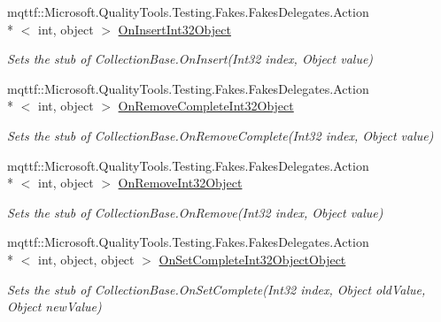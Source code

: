\begin{DoxyCompactItemize}
mqttf\-::\-Microsoft.\-Quality\-Tools.\-Testing.\-Fakes.\-Fakes\-Delegates.\-Action\\*
$<$ int, object $>$ \hyperlink{class_system_1_1_security_1_1_cryptography_1_1_x509_certificates_1_1_fakes_1_1_stub_x509_certificate2_collection_a53d516ea5e60731465e16e0847ae2247}{On\-Insert\-Int32\-Object}
\begin{DoxyCompactList}\small\item\em Sets the stub of Collection\-Base.\-On\-Insert(\-Int32 index, Object value)\end{DoxyCompactList}\item 
mqttf\-::\-Microsoft.\-Quality\-Tools.\-Testing.\-Fakes.\-Fakes\-Delegates.\-Action\\*
$<$ int, object $>$ \hyperlink{class_system_1_1_security_1_1_cryptography_1_1_x509_certificates_1_1_fakes_1_1_stub_x509_certificate2_collection_a87827a5535e397bb4b798bb74c5d05eb}{On\-Remove\-Complete\-Int32\-Object}
\begin{DoxyCompactList}\small\item\em Sets the stub of Collection\-Base.\-On\-Remove\-Complete(\-Int32 index, Object value)\end{DoxyCompactList}\item 
mqttf\-::\-Microsoft.\-Quality\-Tools.\-Testing.\-Fakes.\-Fakes\-Delegates.\-Action\\*
$<$ int, object $>$ \hyperlink{class_system_1_1_security_1_1_cryptography_1_1_x509_certificates_1_1_fakes_1_1_stub_x509_certificate2_collection_a1156740a80d9a75f28ac4cb872d15d04}{On\-Remove\-Int32\-Object}
\begin{DoxyCompactList}\small\item\em Sets the stub of Collection\-Base.\-On\-Remove(\-Int32 index, Object value)\end{DoxyCompactList}\item 
mqttf\-::\-Microsoft.\-Quality\-Tools.\-Testing.\-Fakes.\-Fakes\-Delegates.\-Action\\*
$<$ int, object, object $>$ \hyperlink{class_system_1_1_security_1_1_cryptography_1_1_x509_certificates_1_1_fakes_1_1_stub_x509_certificate2_collection_ae2e254b418d6e3fdb7f41f890d32133f}{On\-Set\-Complete\-Int32\-Object\-Object}
\begin{DoxyCompactList}\small\item\em Sets the stub of Collection\-Base.\-On\-Set\-Complete(\-Int32 index, Object old\-Value, Object new\-Value)\end{DoxyCompactList}\item 

\end{DoxyCompactItemize}
